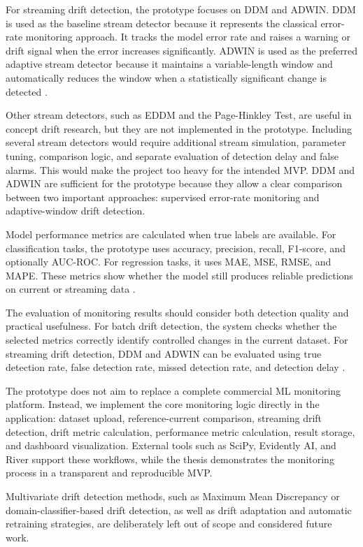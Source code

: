 For streaming drift detection, the prototype focuses on DDM and ADWIN. DDM is used as the baseline stream detector because it represents the classical error-rate monitoring approach. It tracks the model error rate and raises a warning or drift signal when the error increases significantly. ADWIN is used as the preferred adaptive stream detector because it maintains a variable-length window and automatically reduces the window when a statistically significant change is detected \cite{RiverDDM,RiverADWIN,ComparativeConceptDriftDetectors}.

Other stream detectors, such as EDDM and the Page-Hinkley Test, are useful in concept drift research, but they are not implemented in the prototype. Including several stream detectors would require additional stream simulation, parameter tuning, comparison logic, and separate evaluation of detection delay and false alarms. This would make the project too heavy for the intended MVP. DDM and ADWIN are sufficient for the prototype because they allow a clear comparison between two important approaches: supervised error-rate monitoring and adaptive-window drift detection.

Model performance metrics are calculated when true labels are available. For classification tasks, the prototype uses accuracy, precision, recall, F1-score, and optionally AUC-ROC. For regression tasks, it uses MAE, MSE, RMSE, and MAPE. These metrics show whether the model still produces reliable predictions on current or streaming data \cite{ModelMonitoringFrameworks}.

The evaluation of monitoring results should consider both detection quality and practical usefulness. For batch drift detection, the system checks whether the selected metrics correctly identify controlled changes in the current dataset. For streaming drift detection, DDM and ADWIN can be evaluated using true detection rate, false detection rate, missed detection rate, and detection delay \cite{LearningUnderConceptDrift}.

The prototype does not aim to replace a complete commercial ML monitoring platform. Instead, we implement the core monitoring logic directly in the application: dataset upload, reference-current comparison, streaming drift detection, drift metric calculation, performance metric calculation, result storage, and dashboard visualization. External tools such as SciPy, Evidently AI, and River support these workflows, while the thesis demonstrates the monitoring process in a transparent and reproducible MVP. 

Multivariate drift detection methods, such as Maximum Mean Discrepancy or domain-classifier-based drift detection, as well as drift adaptation and automatic retraining strategies, are deliberately left out of scope and considered future work.

